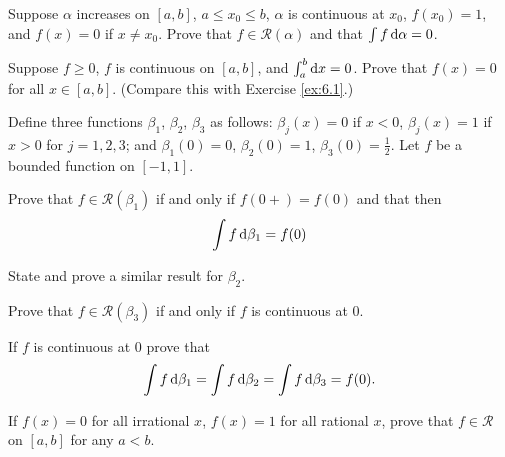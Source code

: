 
\begin{myExercise}
    \label{ex:6.1}
    Suppose $\alpha$ increases on $[a, b]$, $a \leq x_0 \leq b$, 
    $\alpha$ is continuous at $x_0$, $f(x_0) = 1$, and
    $f(x) = 0$ if $x \neq x_0$. 
    Prove that $f \in \mathscr{R}(\alpha)$ and that $\int f \d \alpha = 0$.
\end{myExercise}


\begin{myExercise}
    \label{ex:6.2}
    Suppose $f \geq 0$, 
    $f$ is continuous on $[a, b]$, and
    $\int_{a}^{b} \d x = 0$. 
    Prove that $f(x) = 0$
    for all $x \in [a, b]$. 
    (Compare this with Exercise \ref{ex:6.1}.)
\end{myExercise}


\begin{myExercise}
    \label{ex:6.3}
    Define three functions $\beta_1$, $\beta_2$, $\beta_3$ as follows: 
    $\beta_j(x) = 0$ if $x < 0$, 
    $\beta_j(x) = 1$ if $x > 0$ 
    for $j = 1, 2, 3$; 
    and $\beta_1(0) = 0$, $\beta_2(0) =1$, $\beta_3(0) = \frac{1}{2}$. Let $f$ be a bounded function on $[-1,1]$.
    \begin{asparaenum}[(a)]
        \item Prove that $f \in \mathscr{R}(\beta_1)$ if and only if $f(0+) = f(0)$ and that then 
        \begin{equation*}
            \int f \d \beta_1 = f(0)
        \end{equation*}
        \item State and prove a similar result for $\beta_2$.
        \item Prove that $f \in \mathscr{R}(\beta_3)$ if and only if $f$ is continuous at 0.
        \item If $f$ is continuous at 0 prove that 
        \begin{equation*}
            \int f \d \beta_1 = 
            \int f \d \beta_2 = 
            \int f \d \beta_3 = f(0).
        \end{equation*}
    \end{asparaenum}
\end{myExercise}


\begin{myExercise}
    \label{ex:6.4}
    If $f(x) = 0$ for all irrational $x$,
    $f(x) = 1$ for all rational $x$, 
    prove that $f \in \mathscr{R}$ on $[a, b]$ for any $a < b$.
\end{myExercise}


